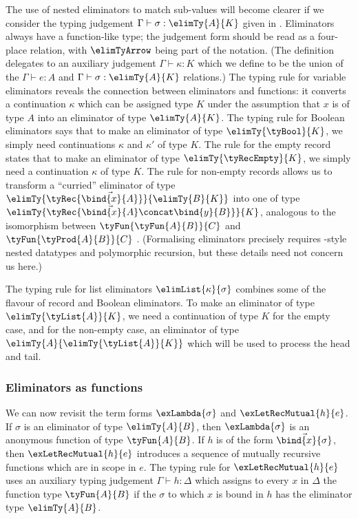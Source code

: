 

The use of nested eliminators to match sub-values will become clearer if we consider the typing judgement $\Gamma \vdash \sigma: \elimTy{A}{K}$ given in . Eliminators always have a function-like type; the judgement form should be read as a four-place relation, with $\elimTyArrow$ being part of the notation. (The definition delegates to an auxiliary judgement $\Gamma \vdash \kappa: K$ which we define to be the union of the $\Gamma \vdash e: A$ and $\Gamma \vdash \sigma: \elimTy{A}{K}$ relations.) The typing rule for variable eliminators reveals the connection between eliminators and functions: it converts a continuation $\kappa$ which can be assigned type $K$ under the assumption that $x$ is of type $A$ into an eliminator of type $\elimTy{A}{K}$. The typing rule for Boolean eliminators says that to make an eliminator of type $\elimTy{\tyBool}{K}$, we simply need continuations $\kappa$ and $\kappa'$ of type $K$. The rule for the empty record states that to make an eliminator of type $\elimTy{\tyRecEmpty}{K}$, we simply need a continuation $\kappa$ of type $K$. The rule for non-empty records allows us to transform a ``curried'' eliminator of type $\elimTy{\tyRec{\vec{\bind{x}{A}}}}{\elimTy{B}{K}}$ into one of type $\elimTy{\tyRec{\vec{\bind{x}{A}} \concat \bind{y}{B}}}{K}$, analogous to the isomorphism between $\tyFun{\tyFun{A}{B}}{C}$ and $\tyFun{\tyProd{A}{B}}{C}$ \cite{hinze00}. (Formalising eliminators precisely requires \citeauthor{bird98}-style nested datatypes \cite{bird98} and polymorphic recursion, but these details need not concern us here.)

The typing rule for list eliminators $\elimList{\kappa}{\sigma}$ combines some of the flavour of record and Boolean eliminators. To make an eliminator of type $\elimTy{\tyList{A}}{K}$, we need a continuation of type $K$ for the empty case, and for the non-empty case, an eliminator of type $\elimTy{A}{\elimTy{\tyList{A}}{K}}$ which will be used to process the head and tail.

\subsubsection{Eliminators as functions}

We can now revisit the term forms $\exLambda{\sigma}$ and $\exLetRecMutual{h}{e}$. If $\sigma$ is an eliminator of type $\elimTy{A}{B}$, then $\exLambda{\sigma}$ is an anonymous function of type $\tyFun{A}{B}$. If $h$ is of the form $\vec{\bind{x}{\sigma}}$, then $\exLetRecMutual{h}{e}$ introduces a sequence of mutually recursive functions which are in scope in $e$. The typing rule for $\exLetRecMutual{h}{e}$ uses an auxiliary typing judgement $\Gamma \vdash h : \Delta$ which assigns to every $x$ in $\Delta$ the function type $\tyFun{A}{B}$ if the $\sigma$ to which $x$ is bound in $h$ has the eliminator type $\elimTy{A}{B}$.

